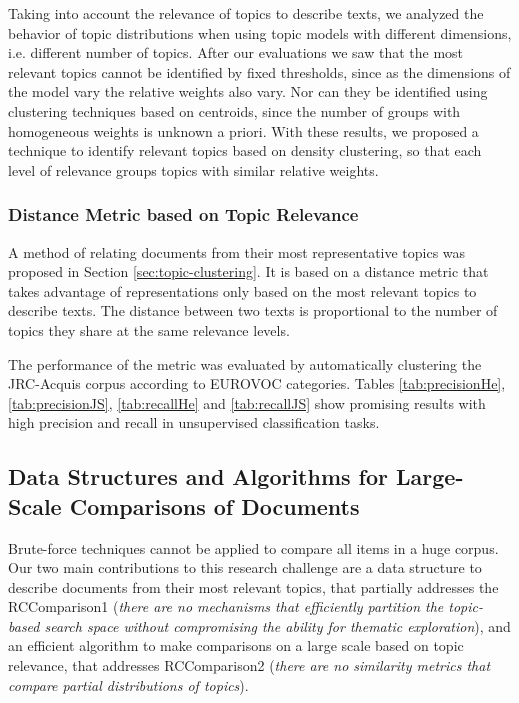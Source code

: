 Taking into account the relevance of topics to describe texts, we analyzed the behavior of topic distributions when using topic models with different dimensions, i.e. different number of topics. After our evaluations we saw that the most relevant topics cannot be identified by fixed thresholds, since as the dimensions of the model vary the relative weights also vary. Nor can they be identified using clustering techniques based on centroids, since the number of groups with homogeneous weights is unknown a priori. With these results, we proposed a technique to identify relevant topics based on density clustering, so that each level of relevance groups topics with similar relative weights.

\subsubsection{Distance Metric based on Topic Relevance}

A method of relating documents from their most representative topics was proposed in Section \ref{sec:topic-clustering}. It is based on a distance metric that takes advantage of representations only based on the most relevant topics to describe texts. The distance between two texts is proportional to the number of topics they share at the same relevance levels.

The performance of the metric was evaluated by automatically clustering the JRC-Acquis corpus according to EUROVOC categories. Tables \ref{tab:precisionHe}, \ref{tab:precisionJS}, \ref{tab:recallHe} and \ref{tab:recallJS} show promising results with high precision and recall in unsupervised classification tasks.


\subsection{Data Structures and Algorithms for Large-Scale Comparisons of Documents}

Brute-force techniques cannot be applied to compare all items in a huge corpus. Our two main contributions to this research challenge are a data structure to describe documents from their most relevant topics, that partially addresses the RCComparison1 (\textit{there are no mechanisms that efficiently partition the topic-based search space without compromising the ability for thematic exploration}), and an efficient algorithm to make comparisons on a large scale based on topic relevance, that addresses RCComparison2 (\textit{there are no similarity metrics that compare partial distributions of topics}).

